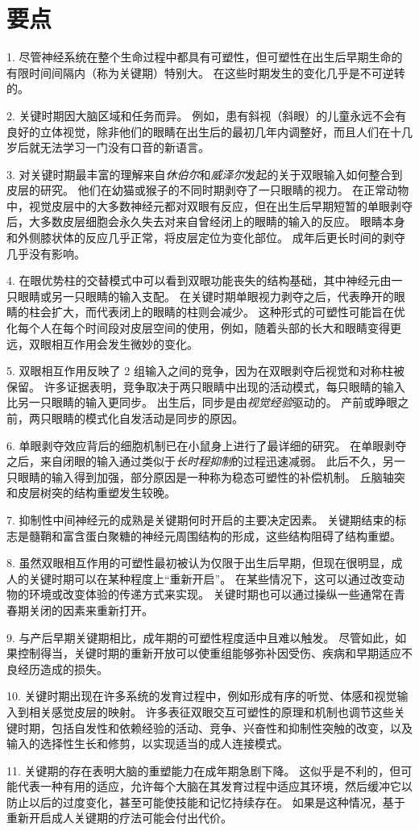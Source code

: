 \section{要点}

1. 尽管神经系统在整个生命过程中都具有可塑性，但可塑性在出生后早期生命的有限时间间隔内（称为关键期）特别大。
在这些时期发生的变化几乎是不可逆转的。


2. 关键时期因大脑区域和任务而异。
例如，患有斜视（斜眼）的儿童永远不会有良好的立体视觉，除非他们的眼睛在出生后的最初几年内调整好，而且人们在十几岁后就无法学习一门没有口音的新语言。


3. 对关键时期最丰富的理解来自\textit{休伯尔}和\textit{威泽尔}发起的关于双眼输入如何整合到皮层的研究。
他们在幼猫或猴子的不同时期剥夺了一只眼睛的视力。
在正常动物中，视觉皮层中的大多数神经元都对双眼有反应，但在出生后早期短暂的单眼剥夺后，大多数皮层细胞会永久失去对来自曾经闭上的眼睛的输入的反应。
眼睛本身和外侧膝状体的反应几乎正常，将皮层定位为变化部位。
成年后更长时间的剥夺几乎没有影响。

4. 在眼优势柱的交替模式中可以看到双眼功能丧失的结构基础，其中神经元由一只眼睛或另一只眼睛的输入支配。
在关键时期单眼视力剥夺之后，代表睁开的眼睛的柱会扩大，而代表闭上的眼睛的柱则会减少。
这种形式的可塑性可能旨在优化每个人在每个时间段对皮层空间的使用，例如，随着头部的长大和眼睛变得更远，双眼相互作用会发生微妙的变化。


5. 双眼相互作用反映了 2 组输入之间的竞争，因为在双眼剥夺后视觉和对称柱被保留。
许多证据表明，竞争取决于两只眼睛中出现的活动模式，每只眼睛的输入比另一只眼睛的输入更同步。
出生后，同步是由\textit{视觉经验}驱动的。
产前或睁眼之前，两只眼睛的模式化自发活动是同步的原因。


6. 单眼剥夺效应背后的细胞机制已在小鼠身上进行了最详细的研究。
在单眼剥夺之后，来自闭眼的输入通过类似于\textit{长时程抑制}的过程迅速减弱。
此后不久，另一只眼睛的输入得到加强，部分原因是一种称为稳态可塑性的补偿机制。
丘脑轴突和皮层树突的结构重塑发生较晚。


7. 抑制性中间神经元的成熟是关键期何时开启的主要决定因素。
关键期结束的标志是髓鞘和富含蛋白聚糖的神经元周围结构的形成，这些结构阻碍了结构重塑。


8. 虽然双眼相互作用的可塑性最初被认为仅限于出生后早期，但现在很明显，成人的关键时期可以在某种程度上“重新开启”。
在某些情况下，这可以通过改变动物的环境或改变体验的传递方式来实现。
关键时期也可以通过操纵一些通常在青春期关闭的因素来重新打开。


9. 与产后早期关键期相比，成年期的可塑性程度适中且难以触发。
尽管如此，如果控制得当，关键时期的重新开放可以使重组能够弥补因受伤、疾病和早期适应不良经历造成的损失。


10. 关键时期出现在许多系统的发育过程中，例如形成有序的听觉、体感和视觉输入到相关感觉皮层的映射。
许多表征双眼交互可塑性的原理和机制也调节这些关键时期，包括自发性和依赖经验的活动、竞争、兴奋性和抑制性突触的改变，以及输入的选择性生长和修剪，以实现适当的成人连接模式。


11. 关键期的存在表明大脑的重塑能力在成年期急剧下降。
这似乎是不利的，但可能代表一种有用的适应，允许每个大脑在其发育过程中适应其环境，然后缓冲它以防止以后的过度变化，甚至可能使技能和记忆持续存在。
如果是这种情况，基于重新开启成人关键期的疗法可能会付出代价。



